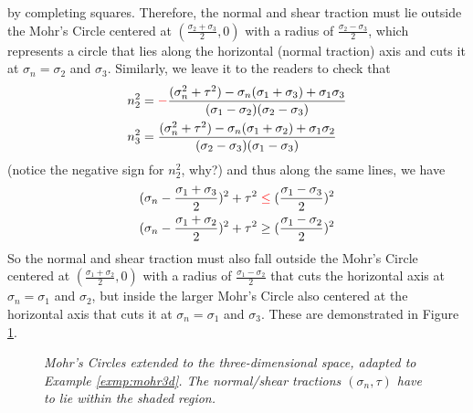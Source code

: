 by completing squares. Therefore, the normal and shear traction must lie outside the Mohr's Circle centered at $(\frac{\sigma_2 + \sigma_3}{2},0)$ with a radius of $\frac{\sigma_2 - \sigma_3}{2}$, which represents a circle that lies along the horizontal (normal traction) axis and cuts it at $\sigma_n = \sigma_2$ and $\sigma_3$. Similarly, we leave it to the readers to check that
\begin{align}
n_2^2 &= \mathcolor{red}{-}\frac{(\sigma_n^2 + \tau^2) - \sigma_n(\sigma_1 + \sigma_3) + \sigma_1\sigma_3}{(\sigma_1 - \sigma_2)(\sigma_2-\sigma_3)} \\
n_3^2 &= \frac{(\sigma_n^2 + \tau^2) - \sigma_n(\sigma_1 + \sigma_2) + \sigma_1\sigma_2}{(\sigma_2 - \sigma_3)(\sigma_1-\sigma_3)}
\end{align}
(notice the negative sign for $n_2^2$, why?) and thus along the same lines, we have
\begin{align}
(\sigma_n-\frac{\sigma_1 + \sigma_3}{2})^2 + \tau^2 &\mathcolor{red}{\leq} (\frac{\sigma_1 - \sigma_3}{2})^2 \\
(\sigma_n-\frac{\sigma_1 + \sigma_2}{2})^2 + \tau^2 &\geq (\frac{\sigma_1 - \sigma_2}{2})^2
\end{align}
So the normal and shear traction must also fall outside the Mohr's Circle centered at $(\frac{\sigma_1 + \sigma_2}{2},0)$ with a radius of $\frac{\sigma_1 - \sigma_2}{2}$ that cuts the horizontal axis at $\sigma_n = \sigma_1$ and $\sigma_2$, but inside the larger Mohr's Circle also centered at the horizontal axis that cuts it at $\sigma_n = \sigma_1$ and $\sigma_3$. These are demonstrated in Figure \ref{fig:mohr3d}.

\begin{figure}
    \centering
    \caption{\textit{Mohr's Circles extended to the three-dimensional space, adapted to Example \ref{exmp:mohr3d}. The normal/shear tractions $(\sigma_n, \tau)$ have to lie within the shaded region.}}
    \label{fig:mohr3d}
\end{figure}


